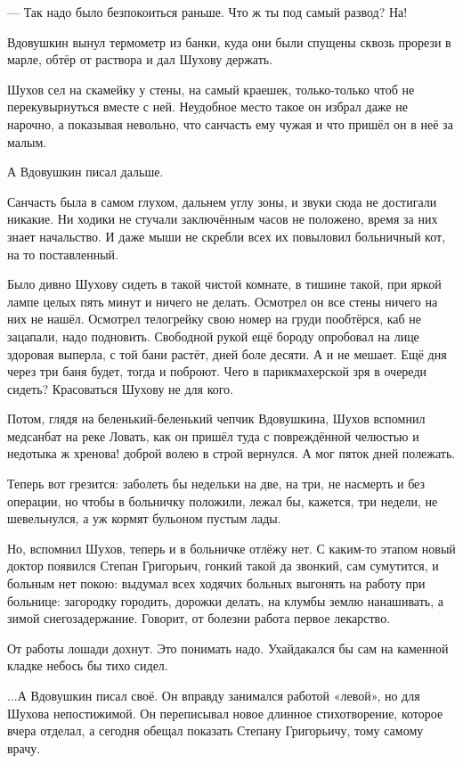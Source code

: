 --- Так надо было безпокоиться раньше. Что ж ты \dash под самый развод? На!

Вдовушкин вынул термометр из банки, куда они были спущены сквозь прорези в марле, обтёр от
раствора и дал Шухову держать.

Шухов сел на скамейку у стены, на самый краешек, только-только чтоб не перекувырнуться
вместе с ней. Неудобное место такое он избрал даже не нарочно, а показывая невольно, что
санчасть ему чужая и что пришёл он в неё за малым.

А Вдовушкин писал дальше.

Санчасть была в самом глухом, дальнем углу зоны, и звуки сюда не достигали никакие. Ни ходики
не стучали \dash заключённым часов не положено, время за них знает начальство. И даже мыши не
скребли \dash всех их повыловил больничный кот, на то поставленный.

Было дивно Шухову сидеть в такой чистой комнате, в тишине такой, при яркой лампе целых пять
минут и ничего не делать. Осмотрел он все стены \dash ничего на них не нашёл. Осмотрел телогрейку
свою \dash номер на груди пообтёрся, каб не зацапали, надо подновить. Свободной рукой ещё бороду
опробовал на лице \dash здоровая выперла, с той бани растёт, дней боле десяти. А и не мешает. Ещё
дня через три баня будет, тогда и поброют. Чего в парикмахерской зря в очереди сидеть?
Красоваться Шухову не для кого.

Потом, глядя на беленький-беленький чепчик Вдовушкина, Шухов вспомнил медсанбат на реке
Ловать, как он пришёл туда с повреждённой челюстью и \dash недотыка ж хренова! \dash доброй волею в
строй вернулся. А мог пяток дней полежать.

Теперь вот грезится: заболеть бы недельки на две, на три, не насмерть и без операции, но чтобы
в больничку положили, \dash лежал бы, кажется, три недели, не шевельнулся, а уж кормят бульоном
пустым \dash лады.

Но, вспомнил Шухов, теперь и в больничке отлёжу нет. С каким-то этапом новый доктор появился
\dash Степан Григорьич, гонкий такой да звонкий, сам сумутится, и больным нет покою: выдумал всех
ходячих больных выгонять на работу при больнице: загородку городить, дорожки делать, на
клумбы землю нанашивать, а зимой \dash снегозадержание. Говорит, от болезни работа \dash первое
лекарство.

От работы лошади дохнут. Это понимать надо. Ухайдакался бы сам на каменной кладке \dash небось
бы тихо сидел.

...А Вдовушкин писал своё. Он вправду занимался работой «левой», но для Шухова непостижимой.
Он переписывал новое длинное стихотворение, которое вчера отделал, а сегодня обещал
показать Степану Григорьичу, тому самому врачу.

